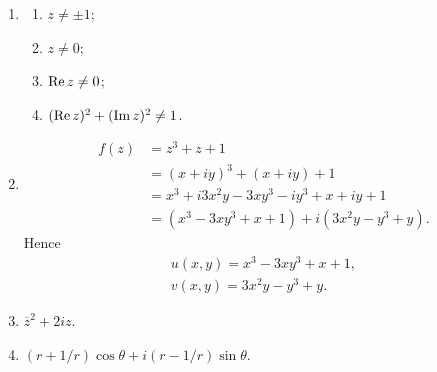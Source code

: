 % 
\begin{enumerate}
    \item %
        \begin{multicols}{2}
            \begin{enumerate}
                \item %
                    $z \neq \pm1$;
                \item %
                    $z \neq 0$;
                \item %
                    $\mathrm{Re}\,{z} \neq 0$;
                \item %
                    $(\mathrm{Re}\,{z})^2 + (\mathrm{Im}\,{z})^2 \neq 1$.
            \end{enumerate}
        \end{multicols}
    \item %
        \begin{align*}
            f(z) &= z^3 + z + 1 \\
            &= (x+iy)^3 + (x+iy) + 1 \\
            &= x^3 + i3x^2y - 3xy^3 - iy^3 + x + iy + 1 \\
            &= (x^3 - 3xy^3 + x + 1) + i(3x^2y - y^3 + y).   
        \end{align*}
        Hence
        \begin{gather*}
            u(x, y) = x^3 - 3xy^3 + x + 1, \\
            v(x, y) = 3x^2y - y^3 + y.
        \end{gather*}
    \item %
        $\overline{z}^2 + 2iz$.
    \item %
        $(r + 1/r)\cos\theta + i(r - 1/r)\sin\theta$.
\end{enumerate}
% 
        